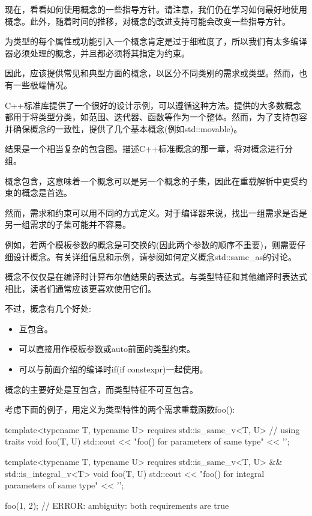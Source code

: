 
现在，看看如何使用概念的一些指导方针。请注意，我们仍在学习如何最好地使用概念。此外，随着时间的推移，对概念的改进支持可能会改变一些指导方针。


为类型的每个属性或功能引入一个概念肯定是过于细粒度了，所以我们有太多编译器必须处理的概念，并且都必须将其指定为约束。

因此，应该提供常见和典型方面的概念，以区分不同类别的需求或类型。然而，也有一些极端情况。

C++标准库提供了一个很好的设计示例，可以遵循这种方法。提供的大多数概念都用于将类型分类，如范围、迭代器、函数等作为一个整体。然而，为了支持包容并确保概念的一致性，提供了几个基本概念(例如std::movable)。

结果是一个相当复杂的包含图。描述C++标准概念的那一章，将对概念进行分组。


概念包含，这意味着一个概念可以是另一个概念的子集，因此在重载解析中更受约束的概念是首选。

然而，需求和约束可以用不同的方式定义。对于编译器来说，找出一组需求是否是另一组需求的子集可能并不容易。

例如，若两个模板参数的概念是可交换的(因此两个参数的顺序不重要)，则需要仔细设计概念。有关详细信息和示例，请参阅如何定义概念std::same\_as的讨论。


概念不仅仅是在编译时计算布尔值结果的表达式。与类型特征和其他编译时表达式相比，读者们通常应该更喜欢使用它们。

不过，概念有几个好处:

\begin{itemize}
\item
互包含。

\item
可以直接用作模板参数或auto前面的类型约束。

\item
可以与前面介绍的编译时if(if constexpr)一起使用。
\end{itemize}



概念的主要好处是互包含，而类型特征不可互包含。

考虑下面的例子，用定义为类型特性的两个需求重载函数foo():

\begin{cpp}
template<typename T, typename U>
requires std::is_same_v<T, U> // using traits
void foo(T, U)
{
	std::cout << "foo() for parameters of same type" << '\n';
}

template<typename T, typename U>
requires std::is_same_v<T, U> && std::is_integral_v<T>
void foo(T, U)
{
	std::cout << "foo() for integral parameters of same type" << '\n';
}

foo(1, 2); // ERROR: ambiguity: both requirements are true
\end{cpp}

